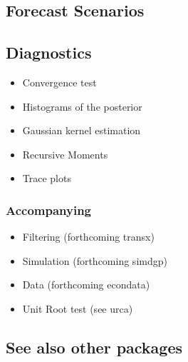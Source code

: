 \documentclass[
]{article}
\providecommand{\tightlist}{%
  \setlength{\itemsep}{0pt}\setlength{\parskip}{0pt}}
\begin{document}
\hypertarget{forecast-scenarios}{%
\subsection{Forecast Scenarios}\label{forecast-scenarios}}

\hypertarget{diagnostics}{%
\subsection{Diagnostics}\label{diagnostics}}

\begin{itemize}
\tightlist
\item
  Convergence test
\item
  Histograms of the posterior
\item
  Gaussian kernel estimation
\item
  Recursive Moments
\item
  Trace plots
\end{itemize}

\hypertarget{accompanying}{%
\subsubsection{Accompanying}\label{accompanying}}

\begin{itemize}
\tightlist
\item
  Filtering (forthcoming transx)
\item
  Simulation (forthcoming simdgp)
\item
  Data (forthcoming econdata)
\item
  Unit Root test (see urca)
\end{itemize}

\hypertarget{see-also-other-packages}{%
\subsection{See also other packages}\label{see-also-other-packages}}
\end{document}
